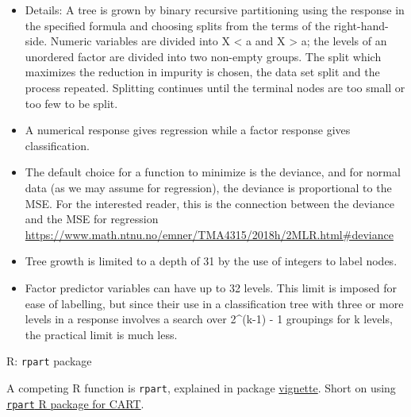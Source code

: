 \documentclass[
  ignorenonframetext,
]{beamer}
\providecommand{\tightlist}{%
  \setlength{\itemsep}{0pt}\setlength{\parskip}{0pt}}
\begin{document}
\begin{frame}

\begin{itemize}
\tightlist
\item
  Details: A tree is grown by binary recursive partitioning using the
  response in the specified formula and choosing splits from the terms
  of the right-hand-side. Numeric variables are divided into X
  \textless{} a and X \textgreater{} a; the levels of an unordered
  factor are divided into two non-empty groups. The split which
  maximizes the reduction in impurity is chosen, the data set split and
  the process repeated. Splitting continues until the terminal nodes are
  too small or too few to be split.
\item
  A numerical response gives regression while a factor response gives
  classification.
\item
  The default choice for a function to minimize is the deviance, and for
  normal data (as we may assume for regression), the deviance is
  proportional to the MSE. For the interested reader, this is the
  connection between the deviance and the MSE for regression
  \url{https://www.math.ntnu.no/emner/TMA4315/2018h/2MLR.html\#deviance}
\end{itemize}

\end{frame}

\begin{frame}[fragile]

\begin{itemize}
\tightlist
\item
  Tree growth is limited to a depth of 31 by the use of integers to
  label nodes.
\item
  Factor predictor variables can have up to 32 levels. This limit is
  imposed for ease of labelling, but since their use in a classification
  tree with three or more levels in a response involves a search over
  2\^{}(k-1) - 1 groupings for k levels, the practical limit is much
  less.
\end{itemize}

\begin{block}{R: \texttt{rpart} package}

A competing R function is \texttt{rpart}, explained in package
\href{https://cran.r-project.org/web/packages/rpart/vignettes/longintro.pdf}{vignette}.
Short on using
\href{https://www.statmethods.net/advstats/cart.html}{\texttt{rpart} R
package for CART}.

\end{block}

\end{frame}
\end{document}
